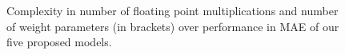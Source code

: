 
\begin{figure}[t]
  \centering
    \begin{adjustbox}{width=0.8\columnwidth}
      
    \end{adjustbox}
    \caption{Complexity in number of floating point multiplications and number of weight parameters (in brackets) over performance in MAE of our five proposed models.}%
  \label{fig:complexity}
\end{figure}

